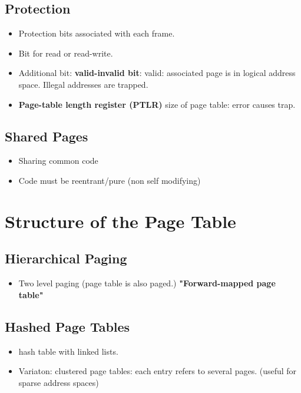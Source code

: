 \documentclass[10pt]{report}
\begin{document}
		\subsection{Protection}
			\begin{itemize}
				\item Protection bits associated with each frame.
				\item Bit for read or read-write.
				\item Additional bit: \textbf{valid-invalid bit}: valid: associated page is in logical address space. Illegal addresses are trapped.
				\item \textbf{Page-table length register (PTLR)} size of page table: error causes trap.
			\end{itemize}

		\subsection{Shared Pages}
			\begin{itemize}
				\item Sharing common code
				\item Code must be reentrant/pure (non self modifying)
			\end{itemize}

	\section{Structure of the Page Table}
		\subsection{Hierarchical Paging}
			\begin{itemize}
				\item Two level paging (page table is also paged.) \textbf{"Forward-mapped page table"}
			\end{itemize}

		\subsection{Hashed Page Tables}
			\begin{itemize}
				\item hash table with linked lists.
				\item Variaton: clustered page tables: each entry refers to several pages. (useful for sparse address spaces)
			\end{itemize}
\end{document}

